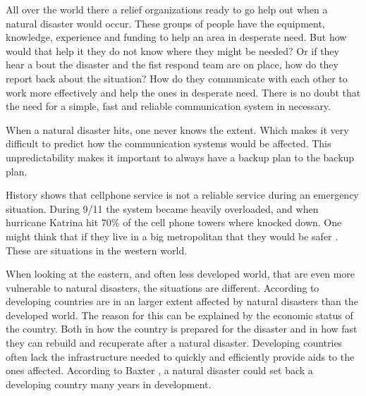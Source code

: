 All over the world there a relief organizations ready to go help out when a natural disaster would occur. These groups of people have the equipment, knowledge, experience and funding to help an area in desperate need. But how would that help it they do not know where they might be needed? Or if they hear a bout the disaster and the fist respond team are on place, how do they report back about the situation? How do they communicate with each other to work more effectively and help the ones in desperate need. There is no doubt that the need for a simple, fast and reliable communication system in necessary. 

When a natural disaster hits, one never knows the extent. Which makes it very difficult to predict how the communication systems would be affected. This unpredictability makes it important to always have a backup plan to the backup plan. 

History shows that cellphone service is not a reliable service during an emergency situation. During 9/11 the system became heavily overloaded, and when hurricane Katrina hit 70\% of the cell phone towers where knocked down. One might think that if they live in a big metropolitan that they would be safer \cite{disasterComm}. These are situations in the western world. 

When looking at the eastern, and often less developed world, that are even more vulnerable to natural disasters, the situations are different. According to \cite{DevelopingWorld, 360} developing countries are in an larger extent affected by natural disasters than the developed world. The reason for this can be explained by the economic status of the country. Both in how the country is prepared for the disaster and in how fast they can rebuild and recuperate after a natural disaster. Developing countries often lack the infrastructure needed to quickly and efficiently provide aids to the ones affected. According to Baxter \cite{360} , a natural disaster could set back a developing country many years in development.  

